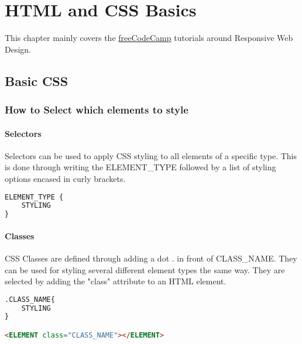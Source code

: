 \chapter{HTML and CSS Basics}
This chapter mainly covers the \href{https://www.freecodecamp.org}{freeCodeCamp} tutorials around
Responsive Web Design.

\section{Basic CSS}
\subsection{How to Select which elements to style}
\subsubsection*{Selectors}
Selectors can be used to apply CSS styling to all elements of a specific type. This is done through
writing the ELEMENT\_TYPE followed by a list of styling options encased in curly brackets.
\begin{lstlisting}[language=HTML, caption="CSS Element type styling example",captionpos=b,frame=tb]
ELEMENT_TYPE {
    STYLING
}
\end{lstlisting}

\subsubsection*{Classes}
CSS Classes are defined through adding a dot \(.\) in front of CLASS\_NAME. They can be used for styling
several different element types the same way. They are selected by adding the "class" attribute to
an HTML element.
\begin{lstlisting}[language=HTML, caption="CSS Classes Example",captionpos=b,frame=tb]
.CLASS_NAME{
    STYLING
} 

<ELEMENT class="CLASS_NAME"></ELEMENT>
\end{lstlisting}

